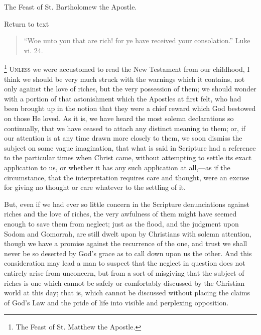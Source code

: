 
The Feast of St. Bartholomew the Apostle.

Return to text


\begin{quote}

``Woe unto you that are rich! for ye have received your
consolation.'' Luke vi. 24.

\end{quote}

\footnote{The Feast of St. Matthew the Apostle.} U\textsc{nless} we were
accustomed to read the New Testament from our childhood, I think we
should be very much struck with the warnings which it contains, not only
against the love of riches, but the very possession of them; we should
wonder with a portion of that astonishment which the Apostles at first
felt, who had been brought up in the notion that they were a chief
reward which God bestowed on those He loved. As it is, we have heard the
most solemn declarations so continually, that we have ceased to attach
any distinct meaning to them; or, if our attention is at any time drawn
more closely to them, we soon dismiss the subject on some vague
imagination, that what is said in Scripture had a reference to the
particular times when Christ came, without attempting to settle its
exact application to us, or whether it has any such application at all,—as
if the circumstance, that the interpretation requires care and
thought, were an excuse for giving no thought or care whatever to the
settling of it.

But, even if we had ever so little concern in the Scripture
denunciations against riches and the love of riches, the very awfulness
of them might have seemed enough to save them from neglect; just as the
flood, and the judgment upon Sodom and Gomorrah, are still dwelt upon by
Christians with solemn attention, though we have a promise against the
recurrence of the one, and trust we shall never be so deserted by God's
grace as to call down upon us the other. And this consideration may lead
a man to suspect that the neglect in question does not entirely arise
from unconcern, but from a sort of misgiving that the subject of riches
is one which cannot be safely or comfortably discussed by the Christian
world at this day; that is, which cannot be discussed without placing
the claims of God's Law and the pride of life into visible and
perplexing opposition.


